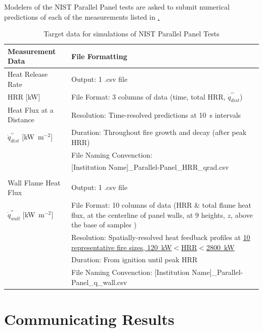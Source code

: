 \documentclass[12pt]{article}
\newcommand{\pp}{\prime\prime}
\begin{document}
Modelers of the NIST Parallel Panel tests are asked to submit numerical predictions of each of the measurements listed in \href{table:Parallel-Panel}.
\begin{table}[htb]
\caption{Target data for simulations of NIST Parallel Panel Tests}
\label{table:Parallel-Panel}
\begin{tabular}{p{0.25\linewidth} | p{0.75\linewidth}}
\hline
\textbf{Measurement Data}       	& \textbf{File Formatting } \\
\hline
Heat Release Rate 	& Output: 1 .csv file\\
HRR $[$kW$]$& File Format: 3 columns of data (time, total HRR, $\dot{q}^{\pp}_{dist}$)\\
Heat Flux at a Distance	& Resolution: Time-resolved predictions at 10~s intervals \\
$\dot{q}^{\pp}_{dist}$ $[$kW~m$^{-2}$$]$	& Duration: Throughout fire growth and decay (after peak HRR) \\
	& File Naming Convenction: \\
	& [Institution Name]\_Parallel-Panel\_HRR\_qrad.csv \\
&	\\
Wall Flame Heat Flux & Output: 1 .csv file\\
$\dot{q}^{''}_{wall}$ $[$kW~m$^{-2}$$]$& File Format: 10 columns of data (HRR \& total flame heat flux, at the centerline of panel walls, at 9 heights, $z$, above the base of samples )\\
	& Resolution: Spatially-resolved heat feedback profiles at \href{https://github.com/MaCFP/macfp-db/blob/master/Fire_Growth/NIST_Parallel_Panel/Experimental_Data/PMMA_heatflux.csv}{10 representative fire sizes, 120~kW$<$HRR$<$2800~kW}\\
	& Duration: From ignition until peak HRR \\
	& File Naming Convenction: [Institution Name]\_Parallel-Panel\_q\_wall.csv \\
\hline
\end{tabular}
\end{table}


\clearpage
\section{Communicating Results}
\label{Sec:Com-Results}
\end{document}
